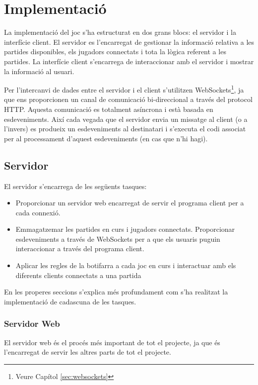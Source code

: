 \chapter{Implementació}
\label{chap:implementacio}

La implementació del joc s'ha estructurat en dos grans blocs: el servidor i la interfície client. El servidor es l'encarregat de gestionar la informació relativa a les partides disponibles, els jugadors connectats i tota la lògica referent a les partides. La interfície client s'encarrega de interaccionar amb el servidor i mostrar la informació al usuari. 

Per l'intercanvi de dades entre el servidor i el client s'utilitzen WebSockets\footnote{Veure Capítol \ref{sec:websockets}},  ja que ens proporcionen un canal de comunicació bi-direccional a través del protocol HTTP. Aquesta comunicació es totalment asíncrona i està basada en esdeveniments. Així cada vegada que el servidor envia un missatge al client (o a l'invers) es produeix un esdeveniments al destinatari i s'executa el codi associat per al processament d'aquest esdeveniments (en cas que n'hi hagi). 

\section{Servidor}

El servidor s'encarrega de les següents tasques: 

\begin{itemize}
\item{Proporcionar un servidor web encarregat de servir el programa client per a cada connexió.}
\item{Emmagatzemar les partides en curs i jugadors connectats. Proporcionar esdeveniments a través de WebSockets per a que els usuaris puguin interaccionar a través del programa client. }
\item{Aplicar les regles de la botifarra a cada joc en curs i interactuar amb els diferents clients connectats a una partida}
\end{itemize}

En les properes seccions s'explica més profundament com s'ha realitzat la implementació de cadascuna de les tasques. 

\subsection{Servidor Web}

El servidor web és el procés més important de tot el projecte, ja que és l'encarregat de servir les altres parts de tot el projecte. 

